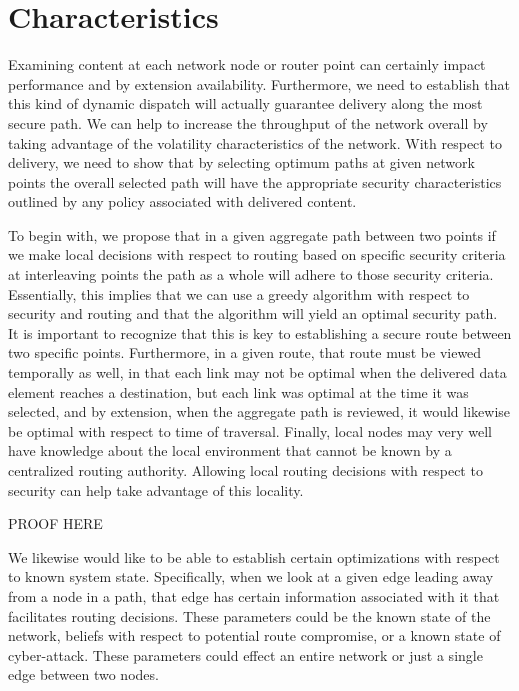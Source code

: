 \section{Characteristics}
\label{section:characteristics}
Examining content at each network node or router point can certainly impact performance and by extension availability.  Furthermore, we need to establish that this kind of dynamic dispatch will actually guarantee delivery along the most secure path.  We can help to increase the throughput of the network overall by taking advantage of the volatility characteristics of the network.  With respect to delivery, we need to show that by selecting optimum paths at given network points the overall selected path will have the appropriate security characteristics outlined by any policy associated with delivered content.

To begin with, we propose that in a given aggregate path between two points if we make local decisions with respect to routing based on specific security criteria at interleaving points the path as a whole will adhere to those security criteria.  Essentially, this implies that we can use a greedy algorithm with respect to security and routing and that the algorithm will yield an optimal security path.  It is important to recognize that this is key to establishing a secure route between two specific points.  Furthermore, in a given route, that route must be viewed temporally as well, in that each link may not be optimal when the delivered data element reaches a destination, but each link was optimal at the time it was selected, and by extension, when the aggregate path is reviewed, it would likewise be optimal with respect to time of traversal.  Finally, local nodes may very well have knowledge about the local environment that cannot be known by a centralized routing authority.  Allowing local routing decisions with respect to security can help take advantage of this locality.



\color{red}
PROOF HERE
\color{black}

We likewise would like to be able to establish certain optimizations with respect to known system state.  Specifically, when we look at a given edge leading away from a node in a path, that edge has certain information associated with it that facilitates routing decisions.  These parameters could be the known state of the network, beliefs with respect to potential route compromise, or a known state of cyber-attack.  These parameters could effect an entire network or just a single edge between two nodes.

